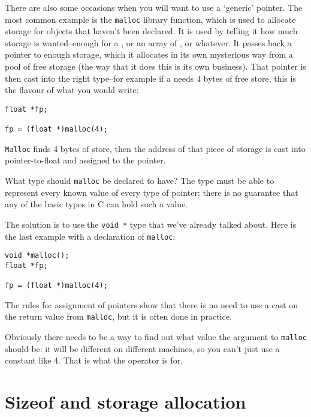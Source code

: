    There are also some occasions when you will want to use
    a `generic' pointer. The most common example is the
    \texttt{malloc} library function, which is used to allocate storage
    for objects that haven't been declared. It is used by telling it how
    much storage is wanted--enough for a \float, or an array
    of \kint, or whatever. It passes back a pointer to enough
    storage, which it allocates in its own mysterious way from a pool of
    free storage (the way that it does this is its own business). That
    pointer is then cast into the right type--for example if
    a \float{} needs 4 bytes of free store, this is the flavour of
    what you would write:


   \begin{Verbatim}
float *fp;

fp = (float *)malloc(4);
\end{Verbatim}

   \texttt{Malloc} finds 4 bytes of store, then the address of that
    piece of storage is cast into pointer-to-float and assigned to the
    pointer.


   What type should \texttt{malloc} be declared to have? The type
    must be able to represent every known value of every type of pointer;
    there is no guarantee that any of the basic types in C can hold such
    a value.


   The solution is to use the \texttt{void *} type that we've already
    talked about. Here is the last example with a declaration of
    \texttt{malloc}:


   \begin{Verbatim}
void *malloc();
float *fp;

fp = (float *)malloc(4);
\end{Verbatim}

   The rules for assignment of pointers show that there is no need to use
    a cast on the return value from \texttt{malloc}, but it is often
    done in practice.


   Obviously there needs to be a way to find out what value the argument
    to \texttt{malloc} should be: it will be different on different
    machines, so you can't just use a constant like 4. That is what the
    \sizeof{} operator is for.


  

 
        \section{Sizeof and storage allocation}
        


